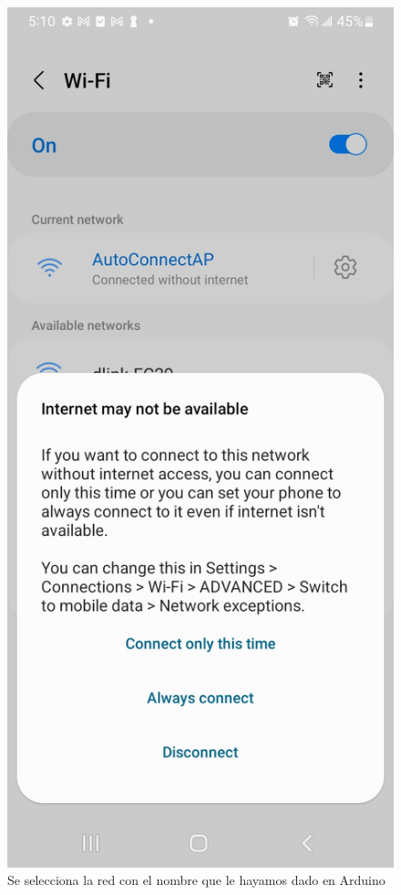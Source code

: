 \documentclass[oneside]{article}
\begin{document}
\begin{figure}[H]
\includegraphics[scale=.15]{images/wifi_config2.jpg}
\caption{Se selecciona la red con el nombre que le hayamos dado en Arduino}
\end{figure}
\end{document}
